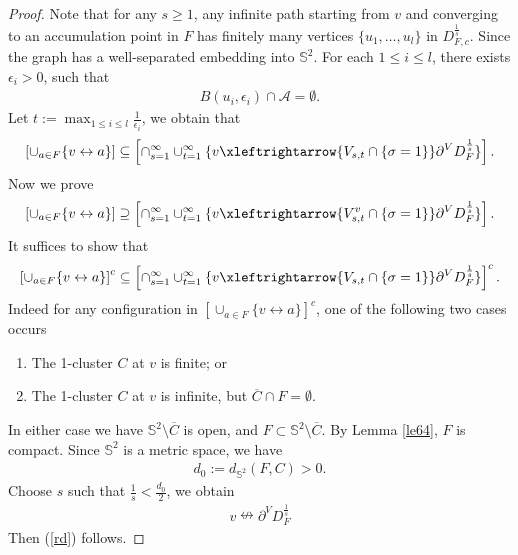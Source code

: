 \documentclass[11pt]{amsart}
\theoremstyle{plain}
\numberwithin{equation}{section}
\numberwithin{figure}{section}
\begin{document}
\begin{proof}Note that for any $s\geq 1$, any infinite path starting from $v$ and converging to an accumulation point in $F$ has finitely many vertices $\{u_1,\ldots,u_l\}$ in $D_{F,c}^{\frac{1}{s}}$. Since the graph has a well-separated embedding into $\mathbb{S}^2$. For each $1\leq i\leq l$, there exists $\epsilon_i>0$, such that
\begin{align*}
B(u_i,\epsilon_i)\cap \mathcal{A}=\emptyset.
\end{align*}
Let $t:=\max_{1\leq i\leq l}\frac{1}{\epsilon_i}$, we obtain that 
\begin{align*}
\left[\cup_{a\in  F}\{v\leftrightarrow a\}\right]\subseteq\left[\cap_{s=1}^{\infty}\cup_{t=1}^{\infty}\{v\xleftrightarrow{V_{s,t}\cap\{\sigma=1\}} \partial^V D_{F}^{\frac{1}{s}}\}\right].
\end{align*}
Now we prove 
\begin{align*}
\left[\cup_{a\in  F}\{v\leftrightarrow a\}\right]\supseteq\left[\cap_{s=1}^{\infty}\cup_{t=1}^{\infty}\{v\xleftrightarrow{V_{s,t}^v\cap\{\sigma=1\}} \partial^V D_{F}^{\frac{1}{s}}\}\right].
\end{align*}
It suffices to show that 
\begin{align}
\left[\cup_{a\in  F}\{v\leftrightarrow a\}\right]^c\subseteq\left[\cap_{s=1}^{\infty}\cup_{t=1}^{\infty}\{v\xleftrightarrow{V_{s,t}\cap\{\sigma=1\}} \partial^V D_{F}^{\frac{1}{s}}\}\right]^c.\label{rd}
\end{align}
Indeed for any configuration in $\left[\cup_{a\in  F}\{v\leftrightarrow a\}\right]^c$, one of the following two cases occurs
\begin{enumerate}
\item The 1-cluster $C$ at $v$ is finite; or
\item The 1-cluster $C$ at $v$ is infinite, but $\overline{C}\cap F=\emptyset$.
\end{enumerate}
In either case we have $\mathbb{S}^2\setminus \overline{C}$ is open, and $F\subset \mathbb{S}^2\setminus  \overline{C}$. By Lemma \ref{le64}, $F$ is compact. Since $\mathbb{S}^2$ is a metric space, we have
\begin{align*}
d_0:=d_{\mathbb{S}^2}(F,C)>0.
\end{align*}
Choose $s$ such that $\frac{1}{s}<\frac{d_0}{2}$, we obtain
\begin{align*}
v\nleftrightarrow  \partial^V D_F^{\frac{1}{s}}
\end{align*}
Then (\ref{rd}) follows.
\end{proof}
\end{document}
